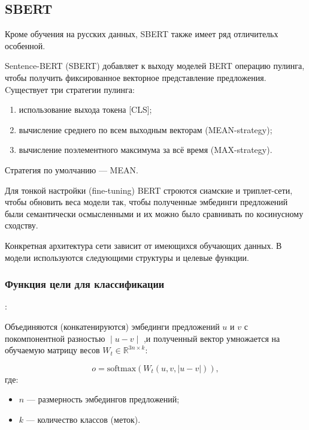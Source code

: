 \subsection{SBERT}

Кроме обучения на русских данных, SBERT также имеет ряд отличительх особенной.

Sentence-BERT (SBERT) добавляет к выходу моделей BERT операцию пулинга, чтобы получить фиксированное векторное представление предложения. Cуществует три стратегии пулинга:

\begin{enumerate}[label=\arabic*.]
\item использование выхода токена [CLS];
\item вычисление среднего по всем выходным векторам (MEAN-strategy);
\item вычисление поэлементного максимума за всё время (MAX-strategy).
\end{enumerate}

Стратегия по умолчанию — MEAN.

Для тонкой настройки (fine-tuning) BERT строются сиамские и триплет-сети, чтобы обновить веса модели так, чтобы полученные эмбединги предложений были семантически осмысленными и их можно было сравнивать по косинусному сходству.

Конкретная архитектура сети зависит от имеющихся обучающих данных. В  модели используются   следующими структуры и целевые функции.

 \subsubsection{Функция цели для классификации}:

 Объединяются (конкатенируются) эмбединги предложений $u$ и $v$ с покомпонентной разностью $∣u−v∣$ ,и  полученный вектор умножается на обучаемую матрицу весов $W_t \in \mathbb{R}^{3n \times k}$:

 
\begin{equation}
o = \mathrm{softmax}(W_t (u, v, |u - v|)) ,
\end{equation}
где:
\begin{itemize}
    \item  $n$ — размерность эмбедингов предложений;
    \item $k$ — количество классов (меток).
\end{itemize} 

